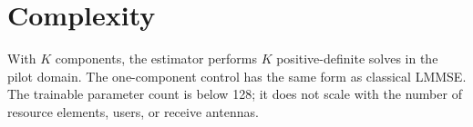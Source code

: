 \documentclass[10pt]{article}
\begin{document}
\section{Complexity}
With $K$ components, the estimator performs $K$ positive-definite solves in the
pilot domain.  The one-component control has the same form as classical LMMSE.
The trainable parameter count is below 128; it does not scale with the number of
resource elements, users, or receive antennas.
\end{document}
